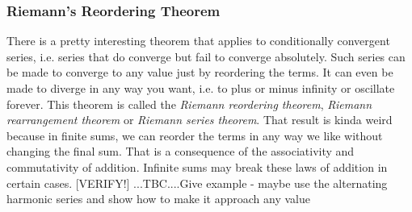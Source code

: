 








\subsubsection{Riemann's Reordering Theorem} There is a pretty interesting theorem that applies to conditionally convergent series, i.e. series that do converge but fail to converge absolutely. Such series can be made to converge to any value just by reordering the terms. It can even be made to diverge in any way you want, i.e. to plus or minus infinity or oscillate forever. This theorem is called the \emph{Riemann reordering theorem}, \emph{Riemann rearrangement theorem} or \emph{Riemann series theorem}. That result is kinda weird because in finite sums, we can reorder the terms in any way we like without changing the final sum. That is a consequence of the associativity and commutativity of addition. Infinite sums may break these laws of addition in certain cases. [VERIFY!] ...TBC....Give example - maybe use the alternating harmonic series and show how to make it approach any value

